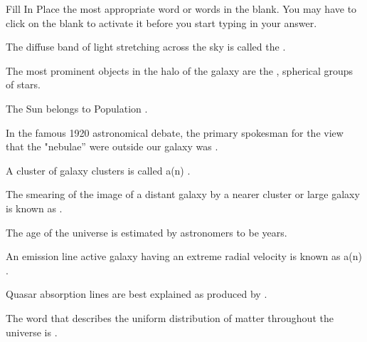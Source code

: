 

    Fill In
    Place the most appropriate word or words in the blank. You may have to click on the blank to activate it before you start typing in your answer.
     
    The diffuse band of light stretching across the sky is called the .

    The most prominent objects in the halo of the galaxy are the , spherical groups of stars.

    The Sun belongs to Population .

    In the famous 1920 astronomical debate, the primary spokesman for the view that the "nebulae'' were outside our galaxy was .

    A cluster of galaxy clusters is called a(n) .

    The smearing of the image of a distant galaxy by a nearer cluster or large galaxy is known as .

    The age of the universe is estimated by astronomers to be years.

    An emission line active galaxy having an extreme radial velocity is known as a(n) .

    Quasar absorption lines are best explained as produced by .

    The word that describes the uniform distribution of matter throughout the universe is .

